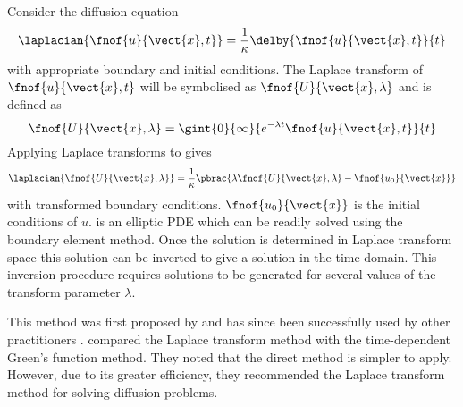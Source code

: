 Consider the diffusion equation
\begin{equation}
  \laplacian{\fnof{u}{\vect{x},t}} = \dfrac{1}{\kappa}
  \delby{\fnof{u}{\vect{x},t}}{t}
\label{eq:lap_diff}
\end{equation}
with appropriate boundary and initial conditions.  The Laplace transform
of $\fnof{u}{\vect{x},t}$ will be symbolised as $\fnof{U}{\vect{x},\lambda}$ and is
defined as
\begin{equation}
  \fnof{U}{\vect{x},\lambda} = \gint{0}{\infty}{e^{-\lambda t}
  \fnof{u}{\vect{x},t}}{t}
\end{equation}
Applying Laplace transforms to  gives
\begin{equation}
  \laplacian{\fnof{U}{\vect{x},\lambda}} = \dfrac{1}{\kappa} \pbrac{\lambda
    \fnof{U}{\vect{x},\lambda} - \fnof{u_{0}}{\vect{x}}}
\label{eq:laptrans}
\end{equation}
with transformed boundary conditions. $\fnof{u_{0}}{\vect{x}}$ is the initial
conditions of $u$.  is an elliptic PDE which can be
readily solved using the boundary element method.  Once the solution is
determined in Laplace transform space this solution can be inverted to give
a solution in the time-domain. This inversion procedure requires solutions
to be generated for several values of the transform parameter $\lambda$.

This method was first proposed by \citet{rizzo:1970} and has since
been successfully used by other practitioners \citep{moridis:1991}
\citep{zhu:1994}.  \citet{liggett:1979} compared the Laplace transform
method with the time-dependent Green's function method. They noted that the
direct method is simpler to apply.  However, due to its greater efficiency,
they recommended the Laplace transform method for solving diffusion
problems.

